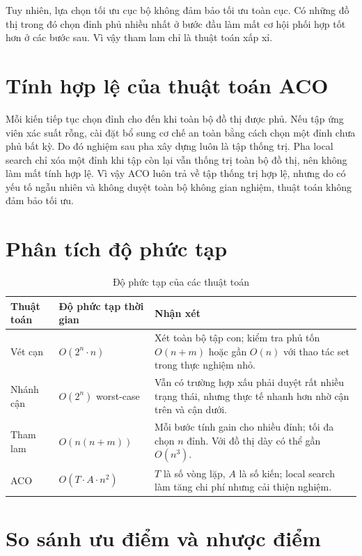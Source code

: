 \documentclass[12pt, a4paper]{report}
\begin{document}
Tuy nhiên, lựa chọn tối ưu cục bộ không đảm bảo tối ưu toàn cục. Có những đồ thị trong đó chọn đỉnh phủ
nhiều nhất ở bước đầu làm mất cơ hội phối hợp tốt hơn ở các bước sau. Vì vậy tham lam chỉ là thuật toán
xấp xỉ.

\section{Tính hợp lệ của thuật toán ACO}

Mỗi kiến tiếp tục chọn đỉnh cho đến khi toàn bộ đồ thị được phủ. Nếu tập ứng viên xác suất rỗng, cài đặt
bổ sung cơ chế an toàn bằng cách chọn một đỉnh chưa phủ bất kỳ. Do đó nghiệm sau pha xây dựng luôn là
tập thống trị. Pha local search chỉ xóa một đỉnh khi tập còn lại vẫn thống trị toàn bộ đồ thị, nên không
làm mất tính hợp lệ. Vì vậy ACO luôn trả về tập thống trị hợp lệ, nhưng do có yếu tố ngẫu nhiên và không
duyệt toàn bộ không gian nghiệm, thuật toán không đảm bảo tối ưu.

\section{Phân tích độ phức tạp}

\begin{table}[H]
  \centering
  \caption{Độ phức tạp của các thuật toán}
  \begin{tabular}{p{3cm} p{4cm} p{6cm}}
    \toprule
    \textbf{Thuật toán} & \textbf{Độ phức tạp thời gian} & \textbf{Nhận xét} \\
    \midrule
    Vét cạn & $O(2^n \cdot n)$ & Xét toàn bộ tập con; kiểm tra phủ tốn $O(n+m)$ hoặc gần $O(n)$ với thao tác set trong thực nghiệm nhỏ. \\
    Nhánh cận & $O(2^n)$ worst-case & Vẫn có trường hợp xấu phải duyệt rất nhiều trạng thái, nhưng thực tế nhanh hơn nhờ cận trên và cận dưới. \\
    Tham lam & $O(n(n+m))$ & Mỗi bước tính gain cho nhiều đỉnh; tối đa chọn $n$ đỉnh. Với đồ thị dày có thể gần $O(n^3)$. \\
    ACO & $O(T \cdot A \cdot n^2)$ & $T$ là số vòng lặp, $A$ là số kiến; local search làm tăng chi phí nhưng cải thiện nghiệm. \\
    \bottomrule
  \end{tabular}
  \label{tab:complexity}
\end{table}

\section{So sánh ưu điểm và nhược điểm}
\end{document}
